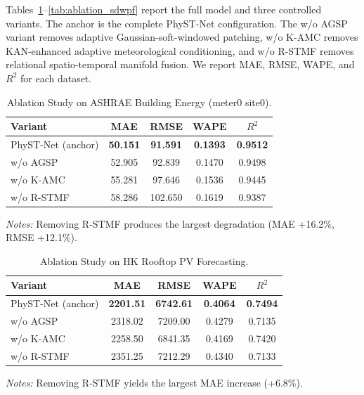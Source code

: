 Tables~\ref{tab:ablation_ashrae}--\ref{tab:ablation_sdwpf} report the full model and three controlled variants. The anchor is the complete PhyST-Net configuration. The w/o AGSP variant removes adaptive Gaussian-soft-windowed patching, w/o K-AMC removes KAN-enhanced adaptive meteorological conditioning, and w/o R-STMF removes relational spatio-temporal manifold fusion. We report MAE, RMSE, WAPE, and $R^2$ for each dataset.

\begin{table}[!t]
\caption{Ablation Study on ASHRAE Building Energy (meter0 site0).}
\label{tab:ablation_ashrae}
\centering
\scriptsize

\renewcommand{\arraystretch}{1.08}
\setlength{\tabcolsep}{0pt}
\begin{tabular*}{\linewidth}{@{\extracolsep{\fill}}lcccc}
\toprule
\textbf{Variant} & \textbf{MAE} & \textbf{RMSE} & \textbf{WAPE} & \textbf{$R^2$} \\
\midrule
PhyST-Net (anchor) & \textbf{50.151} & \textbf{91.591} & \textbf{0.1393} & \textbf{0.9512} \\
w/o AGSP & 52.905 & 92.839 & 0.1470 & 0.9498 \\
w/o K-AMC & 55.281 & 97.646 & 0.1536 & 0.9445 \\
w/o R-STMF & 58.286 & 102.650 & 0.1619 & 0.9387 \\
\bottomrule
\end{tabular*}
\par\vspace{0.65\baselineskip}
\begin{minipage}{\linewidth}
\raggedright\scriptsize
\textit{Notes:} Removing R-STMF produces the largest degradation (MAE +16.2\%, RMSE +12.1\%).
\end{minipage}
\end{table}

\begin{table}[!t]
\caption{Ablation Study on HK Rooftop PV Forecasting.}
\label{tab:ablation_hkpv}
\centering
\scriptsize

\renewcommand{\arraystretch}{1.08}
\setlength{\tabcolsep}{0pt}
\begin{tabular*}{\linewidth}{@{\extracolsep{\fill}}lcccc}
\toprule
\textbf{Variant} & \textbf{MAE} & \textbf{RMSE} & \textbf{WAPE} & \textbf{$R^2$} \\
\midrule
PhyST-Net (anchor) & \textbf{2201.51} & \textbf{6742.61} & \textbf{0.4064} & \textbf{0.7494} \\
w/o AGSP & 2318.02 & 7209.00 & 0.4279 & 0.7135 \\
w/o K-AMC & 2258.50 & 6841.35 & 0.4169 & 0.7420 \\
w/o R-STMF & 2351.25 & 7212.29 & 0.4340 & 0.7133 \\
\bottomrule
\end{tabular*}
\par\vspace{0.65\baselineskip}
\begin{minipage}{\linewidth}
\raggedright\scriptsize
\textit{Notes:} Removing R-STMF yields the largest MAE increase (+6.8\%).
\end{minipage}
\end{table}

